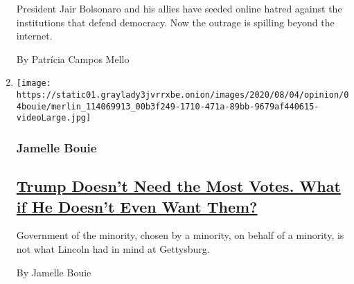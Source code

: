 \begin{enumerate}
  President Jair Bolsonaro and his allies have seeded online hatred
  against the institutions that defend democracy. Now the outrage is
  spilling beyond the internet.

  By Patrícia Campos Mello
\item
  \texttt{[image: https://static01.graylady3jvrrxbe.onion/images/2020/08/04/opinion/04bouie/merlin\_114069913\_00b3f249-1710-471a-89bb-9679af440615-videoLarge.jpg]}

  \hypertarget{jamelle-bouie}{%
  \subsubsection{Jamelle Bouie}\label{jamelle-bouie}}

  \hypertarget{trump-doesnt-need-the-most-votes-what-if-he-doesnt-even-want-them}{%
  \subsection{\texorpdfstring{\href{/2020/08/04/opinion/trump-2020-electoral-college.html}{Trump
  Doesn't Need the Most Votes. What if He Doesn't Even Want
  Them?}}{Trump Doesn't Need the Most Votes. What if He Doesn't Even Want Them?}}\label{trump-doesnt-need-the-most-votes-what-if-he-doesnt-even-want-them}}

  Government of the minority, chosen by a minority, on behalf of a
  minority, is not what Lincoln had in mind at Gettysburg.

  By Jamelle Bouie
\end{enumerate}

